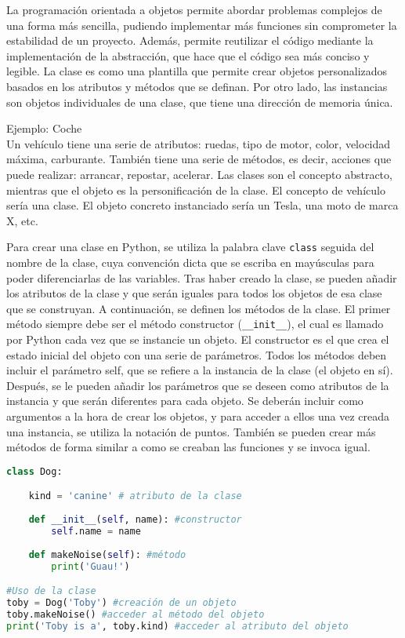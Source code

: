 La programación orientada a objetos permite abordar problemas complejos de una forma más sencilla, pudiendo implementar más funciones sin comprometer la estabilidad de un proyecto. Además, permite reutilizar el código mediante la implementación de la abstracción, que hace que el código sea más conciso y legible. La clase es como una plantilla que permite crear objetos personalizados basados en los atributos y métodos que se definan. Por otro lado, las instancias son objetos individuales de una clase, que tiene una dirección de memoria única.

\begin{table}[htbp]
\begin{mdframed}[backgroundcolor=black!10]
    \centering
Ejemplo: Coche \\
Un vehículo tiene una serie de atributos: ruedas, tipo de motor, color, velocidad máxima, carburante. También tiene una serie de métodos, es decir, acciones que puede realizar: arrancar, repostar, acelerar. Las clases son el concepto abstracto, mientras que el objeto es la personificación de la clase. El concepto de vehículo sería una clase. El objeto concreto instanciado sería un Tesla, una moto de marca X, etc. 
    \end{mdframed}
\end{table}

Para crear una clase en Python, se utiliza la palabra clave \texttt{class} seguida del nombre de la clase, cuya convención dicta que se escriba en mayúsculas para poder diferenciarlas de las variables. Tras haber creado la clase, se pueden añadir los atributos de la clase y que serán iguales para todos los objetos de esa clase que se construyan. A continuación, se definen los métodos de la clase. El primer método siempre debe ser el método constructor (\texttt{\_\_init\_\_}), el cual es llamado por Python cada vez que se instancie un objeto. El constructor es el que crea el estado inicial del objeto con una serie de parámetros. Todos los métodos deben incluir el parámetro self, que se refiere a la instancia de la clase (el objeto en sí). Después, se le pueden añadir los parámetros que se deseen como atributos de la instancia y que serán diferentes para cada objeto. Se deberán incluir como argumentos a la hora de crear los objetos, y para acceder a ellos una vez creada una instancia, se utiliza la notación de puntos. También se pueden crear más métodos de forma similar a como se creaban las funciones y se invoca igual.
\begin{lstlisting}[language=Python]
class Dog:

	kind = 'canine' # atributo de la clase
	
	def __init__(self, name): #constructor
		self.name = name
		
	def makeNoise(self): #método
		print('Guau!')

#Uso de la clase
toby = Dog('Toby') #creación de un objeto
toby.makeNoise() #acceder al método del objeto
print('Toby is a', toby.kind) #acceder al atributo del objeto
\end{lstlisting}

